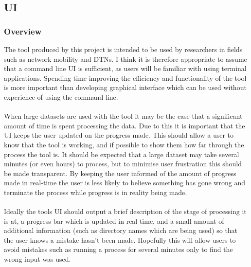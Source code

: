 \subsection{UI} %
\subsubsection{Overview}
The tool produced by this project is intended to be used by researchers in fields such as network mobility and DTNs. I think it is therefore appropriate to assume that a command line UI is sufficient, as users will be familiar with using terminal applications. Spending time improving the efficiency and functionality of the tool is more important than developing graphical interface which can be used without experience of using the command line.\\\\
When large datasets are used with the tool it may be the case that a significant amount of time is spent processing the data. Due to this it is important that the UI keeps the user updated on the progress made. This should allow a user to know that the tool is working, and if possible to show them how far through the process the tool is. It should be expected that a large dataset may take several minutes (or even hours) to process, but to minimise user frustration this should be made transparent. By keeping the user informed of the amount of progress made in real-time the user is less likely to believe something has gone wrong and terminate the process while progress is in reality being made.\\\\
Ideally the tools UI should output a brief description of the stage of processing it is at, a progress bar which is updated in real time, and a small amount of additional information (such as directory names which are being used) so that the user knows a mistake hasn't been made. Hopefully this will allow users to avoid mistakes such as running a process for several minutes only to find the wrong input was used.\\\\

